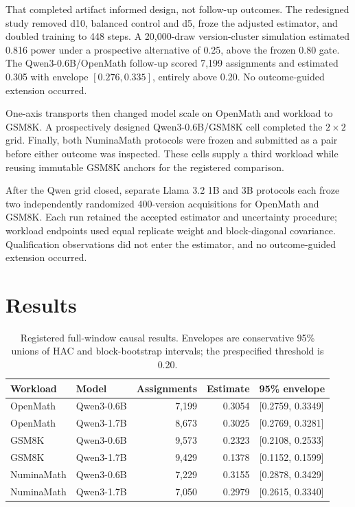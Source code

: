 \documentclass{article}
\begin{document}
That completed artifact informed design, not follow-up outcomes. The redesigned study removed d10, balanced control and d5, froze the adjusted estimator, and doubled training to 448 steps. A 20,000-draw version-cluster simulation estimated 0.816 power under a prospective alternative of 0.25, above the frozen 0.80 gate. The Qwen3-0.6B/OpenMath follow-up scored 7,199 assignments and estimated 0.305 with envelope $[0.276,0.335]$, entirely above 0.20. No outcome-guided extension occurred.

One-axis transports then changed model scale on OpenMath and workload to GSM8K. A prospectively designed Qwen3-0.6B/GSM8K cell completed the $2\times2$ grid. Finally, both NuminaMath protocols were frozen and submitted as a pair before either outcome was inspected. These cells supply a third workload while reusing immutable GSM8K anchors for the registered comparison.

After the Qwen grid closed, separate Llama 3.2 1B and 3B protocols each froze two independently randomized 400-version acquisitions for OpenMath and GSM8K. Each run retained the accepted estimator and uncertainty procedure; workload endpoints used equal replicate weight and block-diagonal covariance. Qualification observations did not enter the estimator, and no outcome-guided extension occurred.

\section{Results}
\begin{table}[t]
\caption{Registered full-window causal results. Envelopes are conservative 95\% unions of HAC and block-bootstrap intervals; the prespecified threshold is 0.20.}
\label{tab:cells}
\centering
\small
\begin{tabular}{llrrl}
\toprule
Workload & Model & Assignments & Estimate & 95\% envelope \\
\midrule
OpenMath & Qwen3-0.6B & 7,199 & 0.3054 & [0.2759, 0.3349] \\
OpenMath & Qwen3-1.7B & 8,673 & 0.3025 & [0.2769, 0.3281] \\
GSM8K & Qwen3-0.6B & 9,573 & 0.2323 & [0.2108, 0.2533] \\
GSM8K & Qwen3-1.7B & 9,429 & 0.1378 & [0.1152, 0.1599] \\
NuminaMath & Qwen3-0.6B & 7,229 & 0.3155 & [0.2878, 0.3429] \\
NuminaMath & Qwen3-1.7B & 7,050 & 0.2979 & [0.2615, 0.3340] \\
\bottomrule
\end{tabular}
\end{table}
\end{document}
